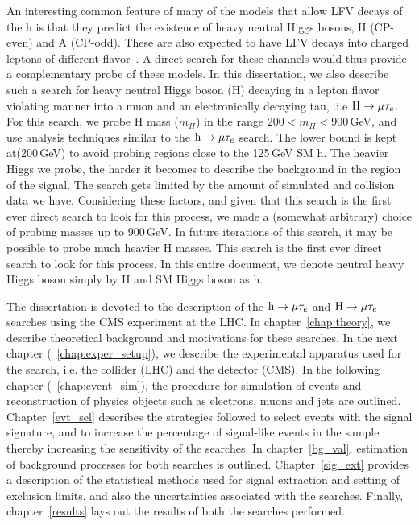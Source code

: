 An interesting common feature of many of the models that allow LFV decays of the h is that they predict the existence of heavy neutral Higgs bosons, H (CP-even) and A (CP-odd). These are also expected to have LFV decays into charged leptons of different flavor~\cite{PhysRevD.93.055021}. A direct search for these channels would thus provide a complementary probe of these models. In this dissertation, we also describe such a search for heavy neutral Higgs boson (H) decaying in a lepton flavor violating manner into a muon and an electronically decaying tau, .i.e $\text{H} \to \mu \tau_{e}$. For this search, we probe H mass ($m_H$) in the range $200<m_H<900$\,GeV, and use analysis techniques similar to the $\text{h} \to \mu \tau_{e}$ search. The lower bound is kept at(200\,GeV) to avoid probing regions close to the 125\,GeV SM h. The heavier Higgs we probe, the harder it becomes to describe the background in the region of the signal. The search gets limited by the amount of simulated and collision data we have. Considering these factors, and given that this search is the first ever direct search to look for this process, we made a (somewhat arbitrary) choice of probing masses up to 900\,GeV. In future iterations of this search, it may be possible to probe much heavier H masses. This search is the first ever direct search to look for this process. In this entire document, we denote neutral heavy Higgs boson simply by H and SM Higgs boson as h.

The dissertation is devoted to the description of the $\text{h} \to \mu \tau_{e}$ and $\text{H} \to \mu \tau_{e}$ searches using the CMS experiment at the LHC. In chapter~\ref{chap:theory}, we describe theoretical background and motivations for these searches. In the next chapter (\!~\ref{chap:exper_setup}), we describe the experimental apparatus used for the search, i.e. the collider (LHC) and the detector (CMS). In the following chapter (\!~\ref{chap:event_sim}), the procedure for simulation of events and reconstruction of physics objects such as electrons, muons and jets are outlined. Chapter~\ref{evt_sel} describes the strategies followed to select events with the signal signature, and to increase the percentage of signal-like events in the sample thereby increasing the sensitivity of the searches. In chapter~\ref{bg_val}, estimation of background processes for both searches is outlined. Chapter~\ref{sig_ext} provides a description of the statistical methods used for signal extraction and setting of exclusion limits, and also the uncertainties associated with the searches. Finally, chapter~\ref{results} lays out the results of both the searches performed.    





